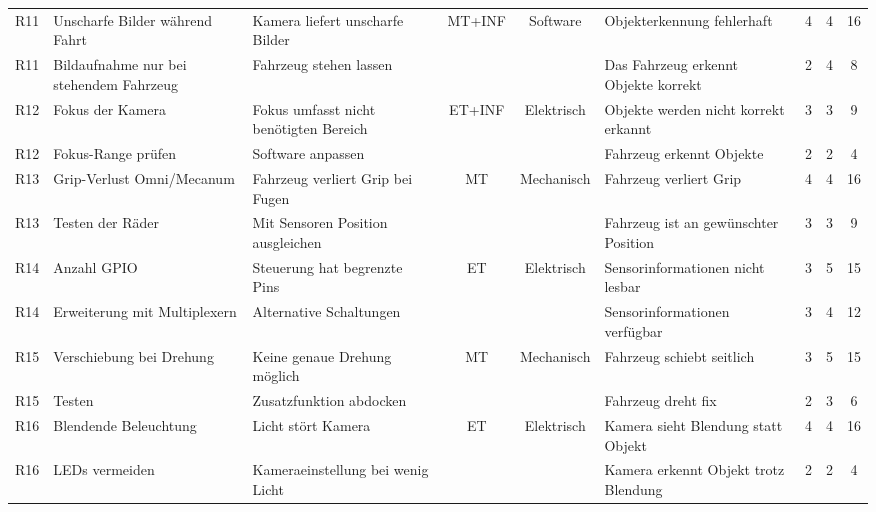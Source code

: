 \documentclass[../main.tex]{subfiles}
\makeatletter
\def\nbhline{%
\noalign{%
  \global\let\tmp\@lowpenalty
  \gdef\@lowpenalty{-10000 }}%
\hline
\noalign{\global\let\@lowpenalty\tmp}}
\makeatother
\begin{document}
\begin{landscape}
\begin{longtable}{|c|p{4cm}|p{4cm}|c|c|p{4cm}|c|c|c|}
\rowcolor[HTML]{F5F5F5} R11 & Unscharfe Bilder während Fahrt & Kamera liefert unscharfe Bilder & MT+INF & Software & Objekterkennung fehlerhaft & 4 & 4 & 16 \\ \nbhline
\rowcolor[HTML]{F5F5F5} R11 & Bildaufnahme nur bei stehendem Fahrzeug & Fahrzeug stehen lassen & & & Das Fahrzeug erkennt Objekte korrekt & 2 & 4 & 8 \\ \hline

\rowcolor{white} R12 & Fokus der Kamera & Fokus umfasst nicht benötigten Bereich & ET+INF & Elektrisch & Objekte werden nicht korrekt erkannt & 3 & 3 & 9 \\ \nbhline
\rowcolor{white} R12 & Fokus-Range prüfen & Software anpassen & & & Fahrzeug erkennt Objekte & 2 & 2 & 4 \\ \hline

\rowcolor[HTML]{F5F5F5} R13 & Grip-Verlust Omni/Mecanum & Fahrzeug verliert Grip bei Fugen & MT & Mechanisch & Fahrzeug verliert Grip & 4 & 4 & 16 \\ \nbhline
\rowcolor[HTML]{F5F5F5} R13 & Testen der Räder & Mit Sensoren Position ausgleichen & & & Fahrzeug ist an gewünschter Position & 3 & 3 & 9 \\ \hline

\rowcolor{white} R14 & Anzahl GPIO & Steuerung hat begrenzte Pins & ET & Elektrisch & Sensorinformationen nicht lesbar & 3 & 5 & 15 \\ \nbhline
\rowcolor{white} R14 & Erweiterung mit Multiplexern & Alternative Schaltungen & & & Sensorinformationen verfügbar & 3 & 4 & 12 \\ \hline

\rowcolor[HTML]{F5F5F5} R15 & Verschiebung bei Drehung & Keine genaue Drehung möglich & MT & Mechanisch & Fahrzeug schiebt seitlich & 3 & 5 & 15 \\ \nbhline
\rowcolor[HTML]{F5F5F5} R15 & Testen & Zusatzfunktion abdocken & & & Fahrzeug dreht fix & 2 & 3 & 6 \\ \hline

\rowcolor{white} R16 & Blendende Beleuchtung & Licht stört Kamera & ET & Elektrisch & Kamera sieht Blendung statt Objekt & 4 & 4 & 16 \\ \nbhline
\rowcolor{white} R16 & LEDs vermeiden & Kameraeinstellung bei wenig Licht & & & Kamera erkennt Objekt trotz Blendung & 2 & 2 & 4 \\ \hline

\end{longtable}
\normalsize    
\end{landscape}
\end{document}
